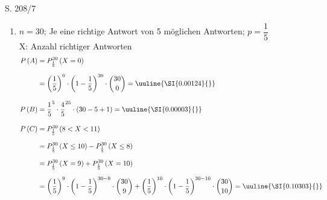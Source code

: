 \begin{Exercise}{S. 208/7}{}
\begin{enumerate}[leftmargin=*]
    \item [7.]{
        $n = 30$; \quad Je eine richtige Antwort von 5 möglichen Antworten; \quad $p = \dfrac{1}{5}$\\[1.0ex]
        X: \quad Anzahl richtiger Antworten\\[-2.0ex]
        \begin{align*}
            P\left(A\right) &= P_{\frac{1}{5}}^{30}\left(X = 0\right)\\[1.5ex]
            &= \left(\dfrac{1}{5}\right)^{0} \cdot \left(1 - \dfrac{1}{5}\right)^{30} \cdot \binom{30}{0} = \uuline{\SI{0.00124}{}}\\[2.0ex]
            P\left(B\right) &= \dfrac{1}{5}^{5} \cdot \dfrac{4}{5}^{25} \cdot (30 - 5 + 1) = \uuline{\SI{0.00003}{}}\\[2.0ex]
            P\left(C\right) &= P_{\frac{1}{5}}^{30}\left(8 < X < 11\right)\\[1.5ex]
            &= P_{\frac{1}{5}}^{30}\left(X \leq 10\right) - P_{\frac{1}{5}}^{30}\left(X \leq 8\right)\\[1.5ex]
            &= P_{\frac{1}{5}}^{30}\left(X = 9\right) + P_{\frac{1}{5}}^{30}\left(X = 10\right)\\[1.5ex]
            &= \left(\dfrac{1}{5}\right)^{9} \cdot \left(1 - \dfrac{1}{5}\right)^{30-9} \cdot \binom{30}{9} + \left(\dfrac{1}{5}\right)^{10} \cdot \left(1 - \dfrac{1}{5}\right)^{30-10} \cdot \binom{30}{10} = \uuline{\SI{0.10303}{}}
        \end{align*}
    }
\end{enumerate}
\end{Exercise}


